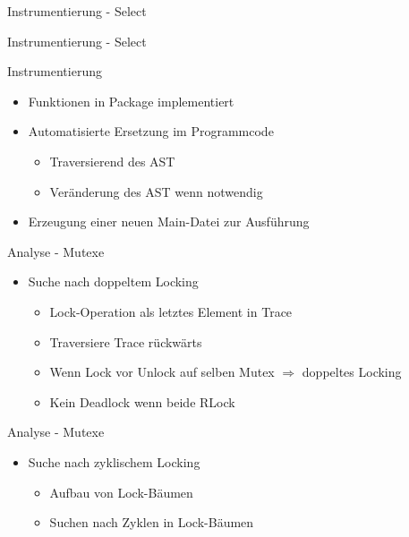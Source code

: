 \documentclass[aspectratio=169]{beamer}  %
\begin{document}
\begin{frame}{Instrumentierung - Select}
  
\end{frame}

\begin{frame}{Instrumentierung - Select}
  
\end{frame}

\begin{frame}{Instrumentierung}
  \begin{itemize}
    \item Funktionen in Package implementiert
    \item Automatisierte Ersetzung im Programmcode
    \begin{itemize}
      \item Traversierend des AST
      \item Veränderung des AST wenn notwendig
    \end{itemize}
    \item Erzeugung einer neuen Main-Datei zur Ausführung
  \end{itemize}
\end{frame}




\begin{frame}{Analyse - Mutexe}
  \begin{itemize}
    \item Suche nach doppeltem Locking
    \begin{itemize}
      \item Lock-Operation als letztes Element in Trace
      \item Traversiere Trace rückwärts
      \item Wenn Lock vor Unlock auf selben Mutex $\Rightarrow$ doppeltes Locking
      \item Kein Deadlock wenn beide RLock
    \end{itemize}
  \end{itemize}
\end{frame}

\begin{frame}{Analyse - Mutexe}
  \begin{itemize}
    \item Suche nach zyklischem Locking
    \begin{itemize}
      \item Aufbau von Lock-Bäumen
      \item Suchen nach Zyklen in Lock-Bäumen
    \end{itemize}
  \end{itemize}
\end{frame}
\end{document}

